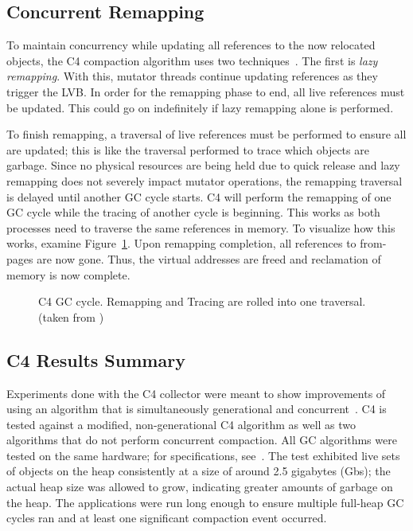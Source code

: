 \documentclass{sig-alternate}
\begin{document}
\subsection{Concurrent Remapping}
\label{sec:c4Remapping}

To maintain concurrency while updating all references to the now relocated
objects, the C4 compaction algorithm uses two techniques~\cite{Tene:C4}. The first is
\emph{lazy remapping}. With this, mutator
threads continue updating references as they trigger the LVB. In order for
the remapping phase to end, all live references must be updated.
This could go on indefinitely if lazy remapping alone is performed.

To finish remapping, a traversal of live references must be performed to
ensure all are updated; this is like the traversal performed to trace which
objects are garbage. Since no physical resources are being held due
to quick release and lazy remapping does not severely impact mutator operations,
the remapping traversal is delayed until another GC cycle starts.
C4 will perform the remapping of one GC cycle while the tracing
of another cycle is beginning. This works as both processes need to traverse
the same references in memory. To
visualize how this works, examine Figure~\ref{fig:c4Cycle}. Upon remapping completion, 
all references to from-pages are now gone. Thus, the virtual addresses
are freed and reclamation of memory is now complete. 

\begin{figure}
\centering
{}
\caption{C4 GC cycle. Remapping and Tracing are rolled into one traversal.
(taken from \cite{Tene:C4})}
\label{fig:c4Cycle}
\end{figure}


\subsection{C4 Results Summary}
\label{sec:c4Results}


Experiments done with the C4 collector were meant to show improvements
of using an algorithm that is simultaneously generational and concurrent~\cite{Tene:C4}.
C4 is tested against a modified, non-generational C4 algorithm as well as
two algorithms that do not perform concurrent compaction. 
All GC algorithms were tested on the same hardware; for specifications, see~\cite{Tene:C4}. 
The test exhibited live sets of objects on 
the heap consistently at a size of around 2.5 gigabytes (Gbs); the actual heap size was allowed 
to grow, indicating greater amounts of garbage on the heap. The applications were run long
enough to ensure multiple full-heap GC cycles ran and at least one
significant compaction event occurred.
\end{document}
